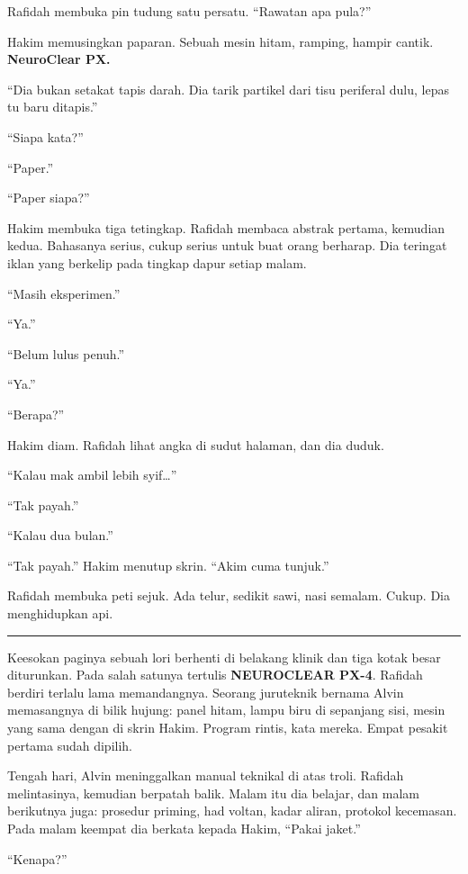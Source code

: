 \documentclass[
  11pt,
  a5paper,
  openany,
  oneside]{book}
\begin{document}
Rafidah membuka pin tudung satu persatu. ``Rawatan apa pula?''

Hakim memusingkan paparan. Sebuah mesin hitam, ramping, hampir cantik.
\textbf{NeuroClear PX.}

``Dia bukan setakat tapis darah. Dia tarik partikel dari tisu periferal
dulu, lepas tu baru ditapis.''

``Siapa kata?''

``Paper.''

``Paper siapa?''

Hakim membuka tiga tetingkap. Rafidah membaca abstrak pertama, kemudian
kedua. Bahasanya serius, cukup serius untuk buat orang berharap. Dia
teringat iklan yang berkelip pada tingkap dapur setiap malam.

``Masih eksperimen.''

``Ya.''

``Belum lulus penuh.''

``Ya.''

``Berapa?''

Hakim diam. Rafidah lihat angka di sudut halaman, dan dia duduk.

``Kalau mak ambil lebih syif\ldots''

``Tak payah.''

``Kalau dua bulan.''

``Tak payah.'' Hakim menutup skrin. ``Akim cuma tunjuk.''

Rafidah membuka peti sejuk. Ada telur, sedikit sawi, nasi semalam.
Cukup. Dia menghidupkan api.

\begin{center}\rule{0.5\linewidth}{0.5pt}\end{center}

Keesokan paginya sebuah lori berhenti di belakang klinik dan tiga kotak
besar diturunkan. Pada salah satunya tertulis \textbf{NEUROCLEAR PX-4}.
Rafidah berdiri terlalu lama memandangnya. Seorang juruteknik bernama
Alvin memasangnya di bilik hujung: panel hitam, lampu biru di sepanjang
sisi, mesin yang sama dengan di skrin Hakim. Program rintis, kata
mereka. Empat pesakit pertama sudah dipilih.

Tengah hari, Alvin meninggalkan manual teknikal di atas troli. Rafidah
melintasinya, kemudian berpatah balik. Malam itu dia belajar, dan malam
berikutnya juga: prosedur priming, had voltan, kadar aliran, protokol
kecemasan. Pada malam keempat dia berkata kepada Hakim, ``Pakai jaket.''

``Kenapa?''
\end{document}
